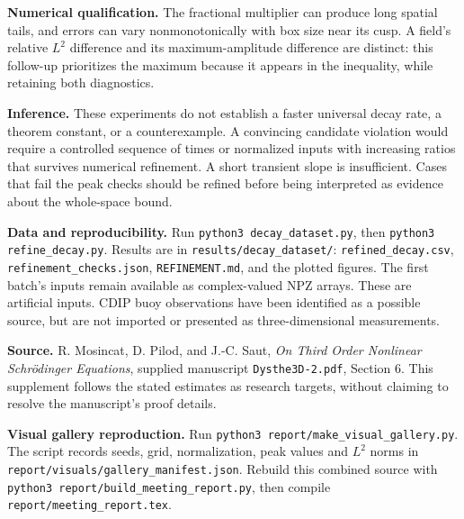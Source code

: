 \documentclass[10pt,letterpaper]{article}
\begin{document}
\textbf{Numerical qualification.} \CheckResult
The fractional multiplier can produce long spatial tails, and errors can vary
nonmonotonically with box size near its cusp. A field's relative $L^2$ difference
and its maximum-amplitude difference are distinct: this follow-up prioritizes the
maximum because it appears in the inequality, while retaining both diagnostics.

\textbf{Inference.} These experiments do not establish a faster universal decay
rate, a theorem constant, or a counterexample. A convincing candidate violation
would require a controlled sequence of times or normalized inputs with increasing
ratios that survives numerical refinement. A short transient slope is insufficient.
Cases that fail the peak checks should be refined before being interpreted as
evidence about the whole-space bound.

\textbf{Data and reproducibility.} Run \texttt{python3 decay\_dataset.py}, then
\texttt{python3 refine\_decay.py}. Results are in
\texttt{results/decay\_dataset/}: \texttt{refined\_decay.csv},
\texttt{refinement\_checks.json}, \texttt{REFINEMENT.md}, and the plotted figures.
The first batch's inputs remain available as complex-valued NPZ arrays.
These are artificial inputs. CDIP buoy observations have been identified as a
possible source, but are not imported or presented as three-dimensional measurements.

\textbf{Source.} R. Mosincat, D. Pilod, and J.-C. Saut,
\emph{On Third Order Nonlinear Schr\"odinger Equations}, supplied manuscript
\texttt{Dysthe3D-2.pdf}, Section 6. This supplement follows the stated estimates
as research targets, without claiming to resolve the manuscript's proof details.

\textbf{Visual gallery reproduction.} Run \texttt{python3 report/make\_visual\_gallery.py}.
The script records seeds, grid, normalization, peak values and $L^2$ norms in
\texttt{report/visuals/gallery\_manifest.json}. Rebuild this combined source with
\texttt{python3 report/build\_meeting\_report.py}, then compile \texttt{report/meeting\_report.tex}.
\newpage
{}\label{longmethods}
\end{document}

